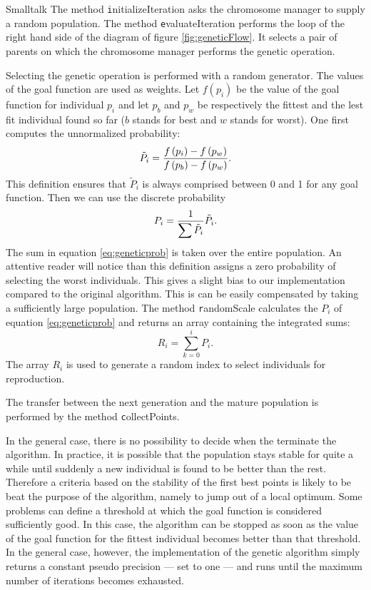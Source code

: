 \begin{displaycode}{Smalltalk}
The method {\texttt initializeIteration} asks the chromosome manager
to supply a random population. The method {\texttt evaluateIteration}
performs the loop of the right hand side of the diagram of figure
\ref{fig:geneticFlow}. It selects a pair of parents on which the
chromosome manager performs the genetic operation.

Selecting the genetic operation is performed with a random
generator. The values of the goal function are used as weights.
Let $f\left(p_i\right)$ be the value of the goal function for
individual $p_i$ and let $p_b$ and $p_w$ be respectively the
fittest and the lest fit individual found so far ($b$ stands for
best and $w$ stands for worst). One first computes the
unnormalized probability:
\begin{equation}
  \tilde{P}_i={\displaystyle f\left(p_i\right) - f\left(p_w\right)
  \over\displaystyle f\left(p_b\right) - f\left(p_w\right)}.
\end{equation}
This definition ensures that $\tilde{P}_i$ is always comprised
between 0 and 1 for any goal function. Then we can use the
discrete probability
\begin{equation}
\label{eq:geneticprob}
  P_i={\displaystyle  1
  \over\displaystyle \sum\tilde{P}_i} \tilde{P}_i.
\end{equation}
The sum in equation \ref{eq:geneticprob} is taken over the entire
population. An attentive reader will notice than this definition
assigns a zero probability of selecting the worst individuals.
This gives a slight bias to our implementation compared to the
original algorithm. This is can be easily compensated by taking a
sufficiently large population. The method {\texttt randomScale}
calculates the $P_i$ of equation \ref{eq:geneticprob} and returns
an array containing the integrated sums:
\begin{equation}
  R_i=\sum_{k=0}^i P_i.
\end{equation}
The array $R_i$ is used to generate a random index to select
individuals for reproduction.

\noindent The transfer between the next generation and the mature
population is performed by the method {\texttt collectPoints}.

In the general case, there is no possibility to decide when the
terminate the algorithm. In practice, it is possible that the
population stays stable for quite a while until suddenly a new
individual is found to be better than the rest. Therefore a
criteria based on the stability of the first best points is likely
to be beat the purpose of the algorithm, namely to jump out of a
local optimum. Some problems can define a threshold at which the
goal function is considered sufficiently good. In this case, the
algorithm can be stopped as soon as the value of the goal function
for the fittest individual becomes better than that threshold. In
the general case, however, the implementation of the genetic
algorithm simply returns a constant pseudo precision
--- set to one --- and runs until the maximum number of iterations
becomes exhausted.


\end{displaycode}

